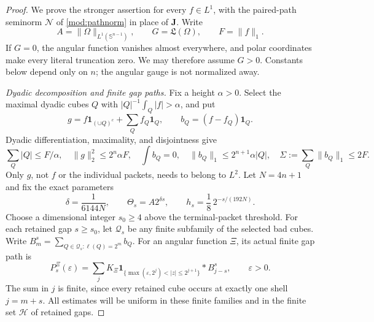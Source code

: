 \documentclass[11pt]{article}
\numberwithin{equation}{section}
\theoremstyle{remark}
\theoremstyle{definition}
\newcommand{\Sph}{\mathbb S}
\newcommand{\NN}{\mathcal N}
\begin{document}
\begin{proof}
We prove the stronger assertion for every $f\in L^1$, with the paired-path
seminorm $\NN$ of \eqref{mod:pathnorm} in place of $\mathbf J$.
Write
\[
 A=\|\Omega\|_{L^1(\Sph^{n-1})},\qquad
 G=\mathfrak L(\Omega),\qquad F=\|f\|_1.
\]
If $G=0$, the angular function vanishes almost everywhere, and polar
coordinates make every literal truncation zero.  We may therefore assume
$G>0$.  Constants below depend only on $n$; the angular gauge is not
normalized away.

\smallskip
\noindent\emph{Dyadic decomposition and finite gap paths.}
Fix a height $\alpha>0$.  Select the maximal dyadic cubes $Q$ with
$|Q|^{-1}\int_Q|f|>\alpha$, and put
\[
 g=f\mathbf1_{(\cup Q)^c}+\sum_Qf_Q\mathbf1_Q,
 \qquad b_Q=(f-f_Q)\mathbf1_Q.
\]
Dyadic differentiation, maximality, and disjointness give
\begin{equation}\label{eq:CZterminal}
 \sum_Q|Q|\le F/\alpha,\quad
 \|g\|_2^2\le2^n\alpha F,\quad
 \int b_Q=0,\quad \|b_Q\|_1\le2^{n+1}\alpha|Q|,
 \quad \Sigma:=\sum_Q\|b_Q\|_1\le2F.
\end{equation}
Only $g$, not $f$ or the individual packets, needs to belong to $L^2$.
Let $N=4n+1$ and fix the exact parameters
\begin{equation}\label{eq:nonosc-parameters}
 \delta=\frac1{6144N},\qquad
 \Theta_s=A2^{\delta s},\qquad
 h_s=\frac18\,2^{-s/(192N)}.
\end{equation}
Choose a dimensional integer $s_0\ge4$ above the terminal-packet threshold.
For each retained gap $s\ge s_0$, let $\mathcal Q_s$ be any finite
subfamily of the selected bad cubes.  Write
$B_m^s=\sum_{Q\in\mathcal Q_s:\ell(Q)=2^m}b_Q$.
For an angular function $\Xi$, its actual finite gap path is
\[
 P_s^\Xi(\varepsilon)
 =\sum_j K_\Xi\mathbf1_{\{\max(\varepsilon,2^j)<|z|\le2^{j+1}\}}
       *B_{j-s}^s,\qquad \varepsilon>0.
\]
The sum in $j$ is finite, since every retained cube occurs at exactly one
shell $j=m+s$.  All estimates will be uniform in these finite families
and in the finite set $\mathcal H$ of retained gaps.


\end{proof}
\end{document}
